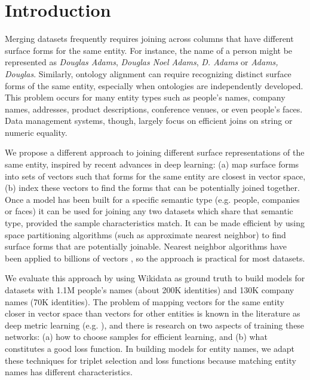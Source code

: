 \section{Introduction}

Merging datasets frequently requires joining across columns that have
different surface forms for the same entity.  For instance, the name of a person might be represented as \textit{Douglas Adams}, \textit{Douglas Noel Adams}, \textit{D. Adams} or \textit{Adams, Douglas}.  Similarly, ontology alignment can require recognizing distinct surface forms of
the same entity, especially when ontologies are independently
developed.  This problem occurs for many entity types such as people's names, company names, addresses, product descriptions, conference venues, or even people's faces.  Data management systems, though, largely focus on efficient joins on string or numeric equality.

We propose a different approach to joining different surface representations of the same entity, inspired by recent advances in deep learning: (a) map surface forms into sets of vectors such that forms for the same entity are closest in vector space, (b) index these vectors to find the forms that can be potentially joined together.  Once a model has been built for a specific semantic type (e.g. people, companies or faces) it can be used for joining any two datasets which share that semantic type, provided the sample characteristics match.  It can be made efficient by using space partitioning algorithms (such as approximate nearest neighbor) to find surface forms that are potentially joinable.  Nearest neighbor algorithms have been applied to billions of vectors \cite{JDH17}, so the approach is practical for most datasets.  

We evaluate this approach by using Wikidata as ground truth to build models for datasets with 1.1M people's names (about 200K identities) and 130K company names (70K identities).  The problem of mapping vectors for the same entity closer in vector space than vectors for other entities is known in the literature as deep metric learning (e.g. \cite{DBLP:conf/cvpr/SchroffKP15}), and there is research on two aspects of training these networks: (a) how to choose samples for efficient learning, and (b) what constitutes a good loss function.  In building models for entity names, we adapt these techniques for triplet selection and loss functions because matching entity names has different characteristics.

